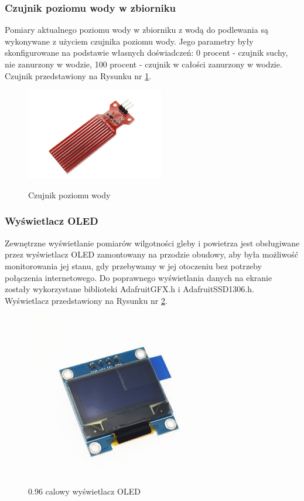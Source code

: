 \documentclass[12pt]{article}
\begin{document}
\newpage
\subsubsection{Czujnik poziomu wody w zbiorniku}
Pomiary aktualnego poziomu wody w zbiorniku z wodą do podlewania są wykonywane z użyciem czujnika poziomu wody. Jego parametry były skonfigurowane na podstawie własnych doświadczeń: 0 procent - czujnik suchy, nie zanurzony w wodzie, 100 procent - czujnik w całości zanurzony w wodzie. Czujnik przedstawiony na Rysunku nr \ref{fig:waterlevel}.
\begin{figure}[!h]
	\begin{center}
		{\includegraphics[width=6cm]{water_sensor_photo.png}}
	\end{center}
	\caption{Czujnik poziomu wody}
	\label{fig:waterlevel}
\end{figure}

\subsubsection{Wyświetlacz OLED}
Zewnętrzne wyświetlanie pomiarów wilgotności gleby i powietrza jest obsługiwane przez wyświetlacz OLED zamontowany na przodzie obudowy, aby była możliwość monitorowania jej stanu, gdy przebywamy w jej otoczeniu bez potrzeby połączenia internetowego. Do poprawnego wyświetlania danych na ekranie zostały wykorzystane biblioteki AdafruitGFX.h i AdafruitSSD1306.h.
Wyświetlacz przedstawiony na Rysunku nr \ref{fig:oled}.
\begin{figure}[!h]
	\begin{center}
		{\includegraphics[width=8cm]{oled-display_photo.png}}
	\end{center}
	\caption{0.96 calowy wyświetlacz OLED}
	\label{fig:oled}
\end{figure}
\end{document}
